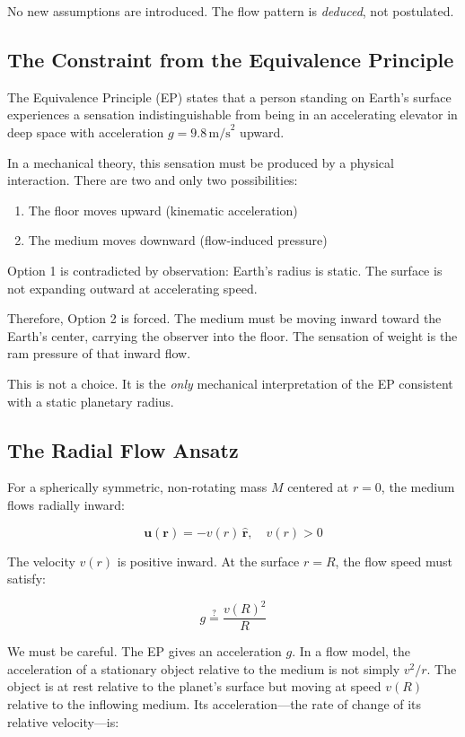 \documentclass[12pt, a4paper]{article}
\begin{document}
No new assumptions are introduced. The flow pattern is \textit{deduced}, not postulated.

\subsection{The Constraint from the Equivalence Principle}
\label{subsec:ep_constraint}

The Equivalence Principle (EP) states that a person standing on Earth's surface experiences a sensation indistinguishable from being in an accelerating elevator in deep space with acceleration \( g = 9.8 \, \text{m/s}^2 \) upward.

In a mechanical theory, this sensation must be produced by a physical interaction. There are two and only two possibilities:

\begin{enumerate}
    \item The floor moves upward (kinematic acceleration)
    \item The medium moves downward (flow-induced pressure)
\end{enumerate}

Option 1 is contradicted by observation: Earth's radius is static. The surface is not expanding outward at accelerating speed.

Therefore, Option 2 is forced. The medium must be moving inward toward the Earth's center, carrying the observer into the floor. The sensation of weight is the ram pressure of that inward flow.

This is not a choice. It is the \textit{only} mechanical interpretation of the EP consistent with a static planetary radius.

\subsection{The Radial Flow Ansatz}
\label{subsec:radial_flow}

For a spherically symmetric, non-rotating mass \( M \) centered at \( r = 0 \), the medium flows radially inward:

\[
\mathbf{u}(\mathbf{r}) = -v(r) \, \hat{\mathbf{r}}, \quad v(r) > 0
\]

The velocity \( v(r) \) is positive inward. At the surface \( r = R \), the flow speed must satisfy:

\[
g \stackrel{?}{=} \frac{v(R)^2}{R}
\]

We must be careful. The EP gives an acceleration \( g \). In a flow model, the acceleration of a stationary object relative to the medium is not simply \( v^2/r \). The object is at rest relative to the planet's surface but moving at speed \( v(R) \) relative to the inflowing medium. Its acceleration—the rate of change of its relative velocity—is:
\end{document}
